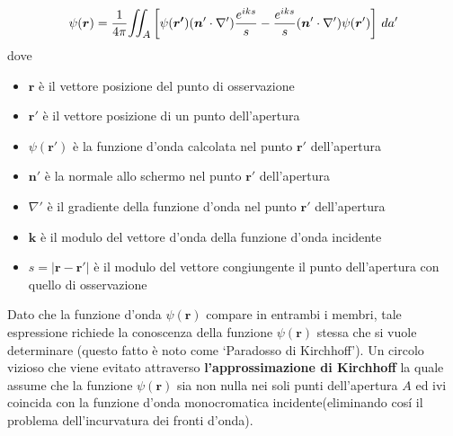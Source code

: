 \begin{equation}
	\psi(\bm{r}) = \frac{1}{4 \pi} \mathlarger{\iint_{A}} \left[ \psi(\bm{r'}) (\bm{n}' \cdot \nabla') \frac{e^{iks}}{s} - \frac{e^{iks}}{s}(\bm{n}' \cdot \nabla') \psi(\bm{r}') \right]  \, da'
	\label{eq:kirchhoff-diffraction-formula}
\end{equation}
dove
\begin{itemize}
	\tightlist
	\item \(\bm{r}\) è il vettore posizione del punto di osservazione
	\item \(\bm{r'}\) è il vettore posizione di un punto dell'apertura
	\item \(\psi(\bm{r'})\) è la funzione d'onda calcolata nel punto \(\bm{r'}\)
	dell'apertura
	\item \(\bm{n}'\) è la normale allo schermo nel punto \(\bm{r'}\)
	dell'apertura
	\item \(\nabla'\) è il gradiente della funzione d'onda nel punto \(\bm{r'}\) dell'apertura
	\item \(\bm{k}\) è il modulo del vettore d'onda della funzione d'onda incidente
	\item \(s = | \bm{r} - \bm{r'}|\) è il modulo del vettore congiungente il punto dell'apertura con quello di osservazione
\end{itemize}
Dato che la funzione d'onda \(\psi(\bm{r})\) compare in entrambi i
membri, tale espressione richiede la conoscenza della funzione
\(\psi(\bm{r})\) stessa che si vuole determinare (questo fatto è noto
come `Paradosso di Kirchhoff').
Un circolo vizioso che viene evitato attraverso \textbf{l'approssimazione di Kirchhoff} la quale assume che la
funzione \(\psi(\bm{r})\) sia non nulla nei soli punti dell'apertura
\(A\) ed ivi coincida con la funzione d'onda monocromatica incidente(eliminando cosí il problema
dell'incurvatura dei fronti d'onda).

